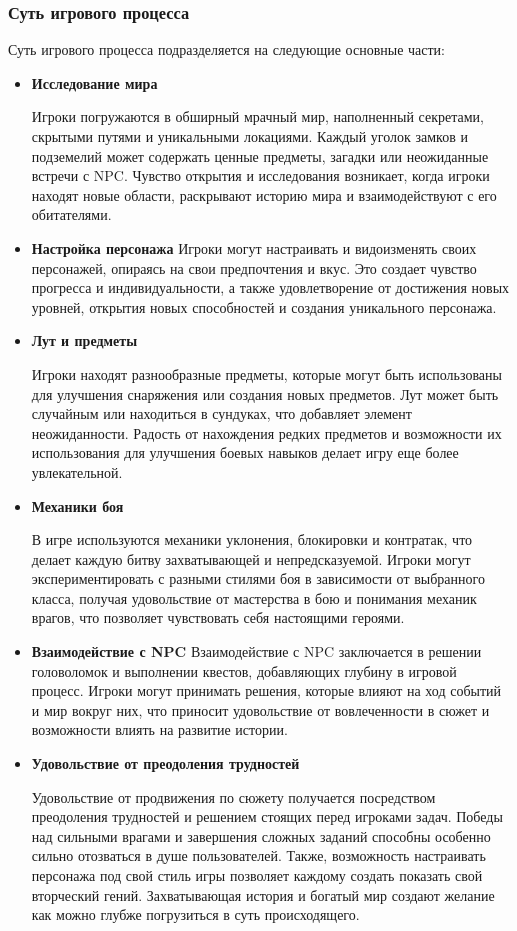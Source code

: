 \documentclass{article}
\begin{document}
\subsubsection{Суть игрового процесса}
\par  Суть игрового процесса подразделяется на следующие основные части:
\begin{itemize}
\item \textbf{Исследование мира} \par  Игроки погружаются в обширный мрачный мир, наполненный секретами, скрытыми путями и уникальными локациями. Каждый уголок замков и подземелий может содержать ценные предметы, загадки или неожиданные встречи с NPC. Чувство открытия и исследования возникает, когда игроки находят новые области, раскрывают историю мира и взаимодействуют с его обитателями. 
\item \textbf{Настройка персонажа}  Игроки могут настраивать и видоизменять своих персонажей, опираясь на свои предпочтения и вкус. Это создает чувство прогресса и индивидуальности, а также удовлетворение от достижения новых уровней, открытия новых способностей и создания уникального персонажа. \item\textbf{Лут и предметы}  \par  Игроки находят разнообразные предметы, которые могут быть использованы для улучшения снаряжения или создания новых предметов. Лут может быть случайным или находиться в сундуках, что добавляет элемент неожиданности. Радость от нахождения редких предметов и возможности их использования для улучшения боевых навыков делает игру еще более увлекательной.\item\textbf{Механики боя}  \par  В игре используются механики уклонения, блокировки и контратак, что делает каждую битву захватывающей и непредсказуемой. Игроки могут экспериментировать с разными стилями боя в зависимости от выбранного класса, получая удовольствие от мастерства в бою и понимания механик врагов, что позволяет чувствовать себя настоящими героями. \item\textbf{Взаимодействие с NPC} Взаимодействие с NPC заключается в решении головоломок и выполнении квестов, добавляющих глубину в игровой процесс. Игроки могут принимать решения, которые влияют на ход событий и мир вокруг них, что приносит удовольствие от вовлеченности в сюжет и возможности влиять на развитие истории.\item\textbf{Удовольствие от преодоления трудностей} \par  Удовольствие от продвижения по сюжету получается посредством преодоления трудностей и решением стоящих перед игроками задач. Победы над сильными врагами и завершения сложных заданий способны особенно сильно отозваться в душе пользователей. Также, возможность настраивать персонажа под свой стиль игры позволяет каждому создать показать свой вторческий гений. Захватывающая история и богатый мир создают желание как можно глубже погрузиться в суть происходящего.
\end{itemize}
\end{document}
